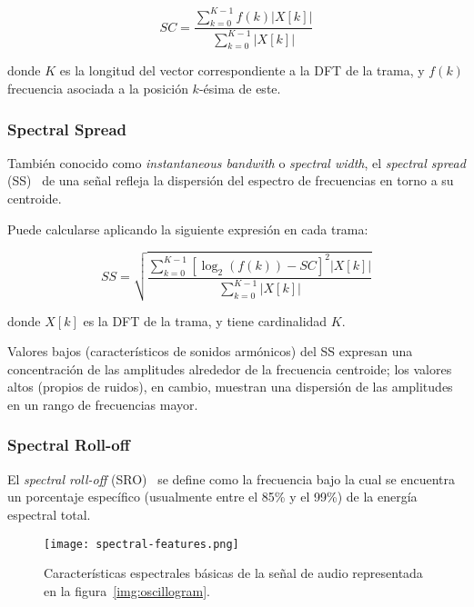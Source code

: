 \begin{equation}
    \label{eq:SC}
    SC = \frac{\sum_{k=0}^{K-1}{f(k)|X[k]|}}{\sum_{k=0}^{K-1}{|X[k]|}}
\end{equation}

\noindent
donde $K$ es la longitud del vector correspondiente a la DFT de la trama, y $f(k)$ frecuencia asociada a la posición $k$-ésima de este.

\subsubsection{Spectral Spread}

También conocido como \textit{instantaneous bandwith} o \textit{spectral width}, el \textit{spectral spread} (SS)~\cite{Fagerlund07,Kim05,Manjunath02,Peters04} de una señal refleja la dispersión del espectro de frecuencias en torno a su centroide.

Puede calcularse aplicando la siguiente expresión en cada trama:

\begin{equation}
    \label{eq:SS}
    SS = \sqrt{\frac{\sum_{k=0}^{K-1}{\left[ \log_{2}{(f(k))-SC} \right]^2 |X[k]|}}{\sum_{k=0}^{K-1}{|X[k]|}}}
\end{equation}

\noindent
donde $X[k]$ es la DFT de la trama, y tiene cardinalidad $K$.

Valores bajos (característicos de sonidos armónicos) del SS expresan una concentración de las amplitudes alrededor de la frecuencia centroide;
los valores altos (propios de ruidos), en cambio, muestran una dispersión de las amplitudes en un rango de frecuencias mayor.

\subsubsection{Spectral Roll-off}\label{subsubsec:spectrallRollOff}

El \textit{spectral roll-off} (SRO)~\cite{Fagerlund07,Peters04} se define como la frecuencia bajo la cual se encuentra un porcentaje específico (usualmente entre el 85\% y el 99\%) de la energía espectral total.

\begin{figure}[!h]
    \centering
    \texttt{[image: spectral-features.png]}
    \caption{Características espectrales básicas de la señal de audio representada en la figura~\ref{img:oscillogram}.}
    \label{img:basic-spectral-descriptors}
\end{figure}

